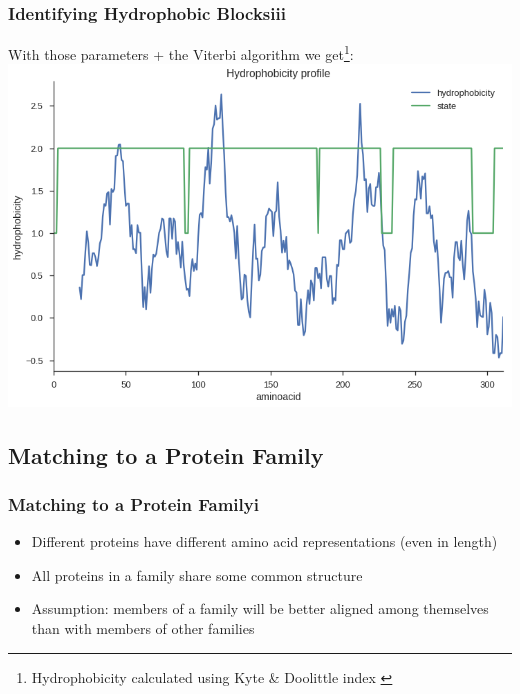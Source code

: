 \documentclass[11pt]{beamer}
\begin{document}
    \begin{frame}
        \frametitle{Identifying Hydrophobic Blocks\quad iii}
        With those parameters + the Viterbi algorithm we get\footnote{Hydrophobicity calculated using Kyte \& Doolittle index \cite{KYTE1982105}}:
        \centering
        \includegraphics[height=0.7\textheight]{images/or_hydro_results.png}
    \end{frame}

    \subsection{Matching to a Protein Family}
    \begin{frame}
        \frametitle{Matching to a Protein Family\quad i}
        \begin{itemize}
            \item Different proteins have different amino acid representations (even in length)
            \item All proteins in a family share some common structure
            \item Assumption: members of a family will be better aligned among themselves than with members of other families
        \end{itemize}
    \end{frame}
    
\end{document}

